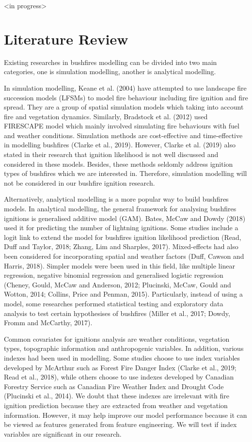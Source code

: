 \documentclass{monashthesis}
\begin{document}
\textless{}in progress\textgreater{}

\chapter{Literature Review}\label{literature-review}

Existing researches in bushfires modelling can be divided into two main
categories, one is simulation modelling, another is analytical
modelling.

In simulation modelling, Keane et al. (2004) have attempted to use
landscape fire succession models (LFSMs) to model fire behaviour
including fire ignition and fire spread. They are a group of spatial
simulation models which taking into account fire and vegetation
dynamics. Similarly, Bradstock et al. (2012) used FIRESCAPE model which
mainly involved simulating fire behaviours with fuel and weather
conditions. Simulation methods are cost-effective and time-effective in
modelling bushfires (Clarke et al., 2019). However, Clarke et al. (2019)
also stated in their research that ignition likelihood is not well
discussed and considered in these models. Besides, these methods
seldomly address ignition types of bushfires which we are interested in.
Therefore, simulation modelling will not be considered in our bushfire
ignition research.

Alternatively, analytical modelling is a more popular way to build
bushfires models. In analytical modelling, the general framework for
analysing bushfires ignitions is generalised additive model (GAM).
Bates, McCaw and Dowdy (2018) used it for predicting the number of
lightning ignitions. Some studies include a logit link to extend the
model for bushfires ignition likelihood prediction (Read, Duff and
Taylor, 2018; Zhang, Lim and Sharples, 2017). Mixed-effects had also
been considered for incorporating spatial and weather factors (Duff,
Cawson and Harris, 2018). Simpler models were been used in this field,
like multiple linear regression, negative binomial regression and
generalised logistic regression (Cheney, Gould, McCaw and Anderson,
2012; Plucinski, McCaw, Gould and Wotton, 2014; Collins, Price and
Penman, 2015). Particularly, instead of using a model, some researches
performed statistical testing and exploratory data analysis to test
certain hypothesises of bushfires (Miller et al., 2017; Dowdy, Fromm and
McCarthy, 2017).

Common covariates for ignitions analysis are weather conditions,
vegetation types, topographic information and anthropogenic variables.
In addition, various indexes had been used in modelling. Some studies
choose to use index variables developed by McArthur such as Forest Fire
Danger Index (Clarke et al., 2019; Read et al., 2018), while others
choose to use indexes developed by Canadian Forestry Service such as
Canadian Fire Weather Index and Drought Code (Plucinski et al., 2014).
We doubt that these indexes are irrelevant with fire ignition prediction
because they are extracted from weather and vegetation information.
However, it may help improve our model performance because it can be
viewed as features generated from feature engineering. We will test if
index variables are significant in our research.
\end{document}
